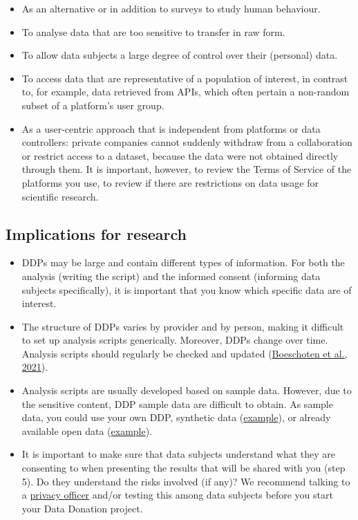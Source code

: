 \documentclass[
]{book}
\providecommand{\tightlist}{%
  \setlength{\itemsep}{0pt}\setlength{\parskip}{0pt}}
\begin{document}
\begin{itemize}
\tightlist
\item
  As an alternative or in addition to surveys to study human behaviour.
\item
  To analyse data that are too sensitive to transfer in raw form.
\item
  To allow data subjects a large degree of control over their (personal) data.
\item
  To access data that are representative of a population of interest, in
  contrast to, for example, data retrieved from APIs, which often pertain a
  non-random subset of a platform's user group.
\item
  As a user-centric approach that is independent from platforms or data
  controllers: private companies cannot suddenly withdraw from a collaboration or
  restrict access to a dataset, because the data were not obtained directly
  through them. It is important, however, to review the Terms of Service of the
  platforms you use, to review if there are restrictions on data usage for
  scientific research.
\end{itemize}

\hypertarget{implications-for-research-4}{%
\subsection{Implications for research}\label{implications-for-research-4}}

\begin{itemize}
\tightlist
\item
  DDPs may be large and contain different types of information. For both the
  analysis (writing the script) and the informed consent (informing data subjects
  specifically), it is important that you know which specific data are of interest.
\item
  The structure of DDPs varies by provider and by person, making it difficult
  to set up analysis scripts generically. Moreover, DDPs change over time.
  Analysis scripts should regularly be checked and updated
  (\href{https://doi.org/10.3233/DS-210035}{Boeschoten et al., 2021}).
\item
  Analysis scripts are usually developed based on sample data. However, due to
  the sensitive content, DDP sample data are difficult to obtain. As sample data,
  you could use your own DDP, synthetic data
  (\href{https://github.com/UtrechtUniversity/google-semantic-location-history}{example}),
  or already available open data
  (\href{http://doi.org/10.5281/zenodo.4472606}{example}).
\item
  It is important to make sure that data subjects understand what they are
  consenting to when presenting the results that will be shared with you (step 5).
  Do they understand the risks involved (if any)? We recommend talking to a
  \protect\hyperlink{support}{privacy officer} and/or testing this among data subjects before you
  start your Data Donation project.
\end{itemize}
\end{document}
